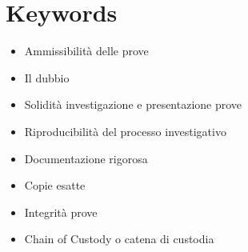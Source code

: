 \chapter*{Keywords}
\begin{itemize}
    \item Ammissibilità delle prove
    \item Il dubbio
    \item Solidità investigazione e presentazione prove
    \item Riproducibilità del processo investigativo
    \item Documentazione rigorosa
    \item Copie esatte
    \item Integrità prove
    \item Chain of Custody o catena di custodia
\end{itemize}